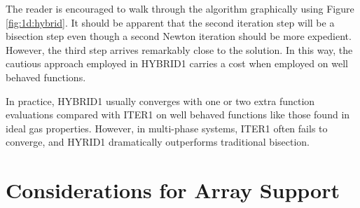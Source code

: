 \documentclass{article}
\begin{document}
The reader is encouraged to walk through the algorithm graphically using Figure \ref{fig:1d:hybrid}.  It should be apparent that the second iteration step will be a bisection step even though a second Newton iteration should be more expedient.  However, the third step arrives remarkably close to the solution.  In this way, the cautious approach employed in HYBRID1 carries a cost when employed on well behaved functions.

In practice, HYBRID1 usually converges with one or two extra function evaluations compared with ITER1 on well behaved functions like those found in ideal gas properties.  However, in multi-phase systems, ITER1 often fails to converge, and HYRID1 dramatically outperforms traditional bisection.  


\section{Considerations for Array Support}
\end{document}

